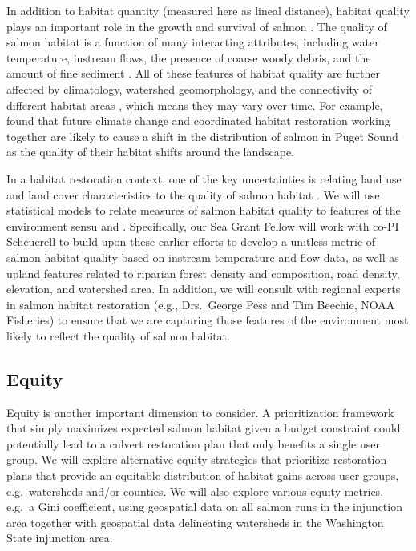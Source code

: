 \documentclass[12pt]{elsarticle}
\begin{document}
In addition to habitat quantity (measured here as lineal distance), habitat quality plays an important role in the growth and survival of salmon \citep{Pess_2011}. The quality of salmon habitat is a function of many interacting attributes, including water temperature, instream flows, the presence of coarse woody debris, and the amount of fine sediment \citep{Bartz_2006,Isaak_2007}. All of these features of habitat quality are further affected by climatology, watershed geomorphology, and the connectivity of different habitat areas \citep{Caissie_2006, Rodeles_2019}, which means they may vary over time. For example, \citet{Battin_2007} found that future climate change and coordinated habitat restoration working together are likely to cause a shift in the distribution of salmon in Puget Sound as the quality of their habitat shifts around the landscape.

In a habitat restoration context, one of the key uncertainties is relating land use and land cover characteristics to the quality of salmon habitat \citep{Bartz_2006, Jorgensen_2009}. We will use statistical models to relate measures of salmon habitat quality to features of the environment sensu \citet{Bartz_2006} and \citet{Jorgensen_2009}. Specifically, our Sea Grant Fellow will work with co-PI Scheuerell to build upon these earlier efforts to develop a unitless metric of salmon habitat quality based on instream temperature and flow data, as well as upland features related to riparian forest density and composition, road density, elevation, and watershed area. In addition, we will consult with regional experts in salmon habitat restoration (e.g., Drs.\ George Pess and Tim Beechie, NOAA Fisheries) to ensure that we are capturing those features of the environment most likely to reflect the quality of salmon habitat.


\subsection*{Equity}

Equity is another important dimension to consider. A prioritization framework that simply maximizes expected salmon habitat given a budget constraint could potentially lead to a culvert restoration plan that only benefits a single user group. We will explore alternative equity strategies that prioritize restoration plans that provide an equitable distribution of habitat gains across user groups, e.g.\ watersheds and/or counties. We will also explore various equity metrics, e.g.\ a Gini coefficient, using geospatial data on all salmon runs in the injunction area together with geospatial data delineating watersheds in the Washington State injunction area. 
\end{document}
